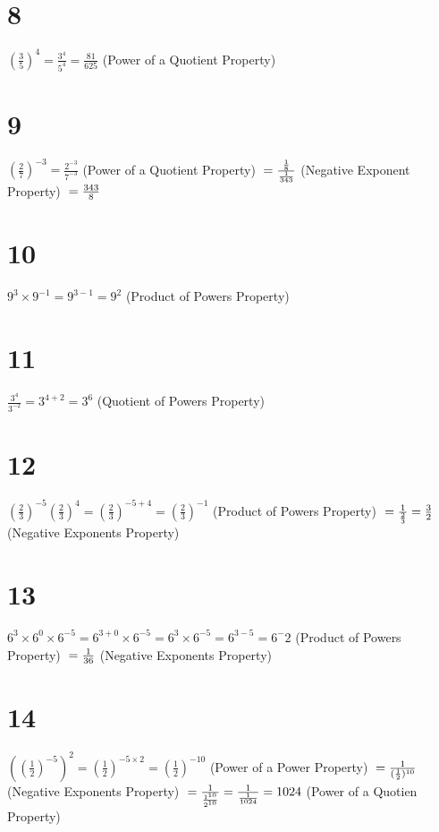 \documentclass{article}
\theoremstyle{definition}
\begin{document}
\section*{8}
$(\frac{3}{5})^4=\frac{3^4}{5^4}=\frac{81}{625}$ (Power of a Quotient Property)

\section*{9}
$(\frac{2}{7})^{-3}=\frac{2^{-3}}{7^{-3}}$ (Power of a Quotient Property)
$\newline =\frac{\frac{1}{8}}{\frac{1}{343}}$ (Negative Exponent Property)
$\newline =\frac{343}{8}$

\section*{10}
$9^3\times 9^{-1}=9^{3-1}=9^2$ (Product of Powers Property)

\section*{11}
$\frac{3^4}{3^{-2}}=3^{4+2}=3^6$ (Quotient of Powers Property)

\section*{12}
$(\frac{2}{3})^{-5}(\frac{2}{3})^4=(\frac{2}{3})^{-5+4}=(\frac{2}{3})^{-1}$ (Product of Powers Property)
$\newline =\frac{1}{\frac{2}{3}}=\frac{3}{2}$ (Negative Exponents Property)

\section*{13}
$6^3\times 6^0\times 6^{-5}=6^{3+0}\times 6^{-5}=6^3\times 6^{-5}=6^{3-5}=6^-2$ (Product of Powers Property)
$\newline =\frac{1}{36}$ (Negative Exponents Property)

\section*{14}
$((\frac{1}{2})^{-5})^2=(\frac{1}{2})^{-5\times 2}=(\frac{1}{2})^{-10}$ (Power of a Power Property)
$\newline =\frac{1}{(\frac{1}{2})^{10}}$ (Negative Exponents Property)
$\newline =\frac{1}{\frac{1^{10}}{2^{10}}}=\frac{1}{\frac{1}{1024}}=1024$ (Power of a Quotien Property)
\end{document}
